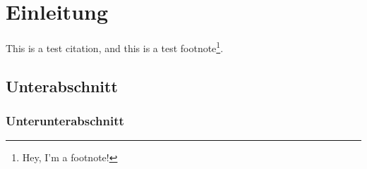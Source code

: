 \thispagestyle{plain}

\section{Einleitung}\label{intro}

\lipsum[1]

This is a test citation\cite{cry:2011}, and this is a test footnote\footnote{\label{fn:test-fn}Hey, I'm a footnote!}.

\subsection{Unterabschnitt}\label{intro:subsection}

\lipsum[2]

\subsubsection{Unterunterabschnitt}\label{intro:subsubsection}

\lipsum[3]